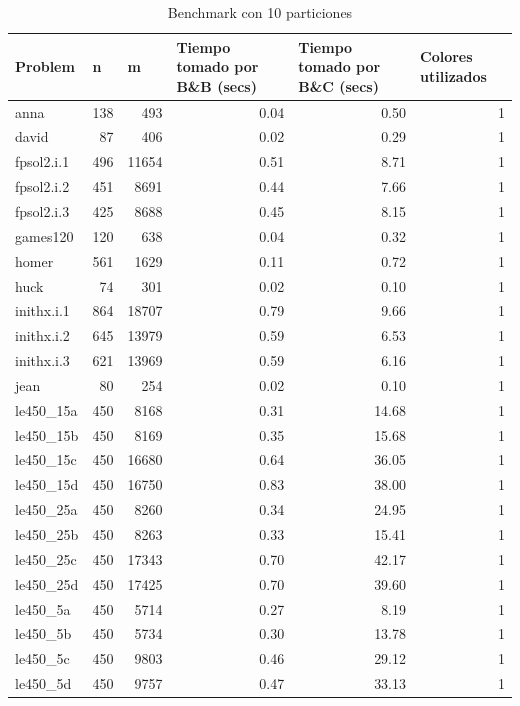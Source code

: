 \begin{table}[H]
\centering
\caption{Benchmark con 10 particiones}
\begin{tabular}{|l|r|r|r|r|r|}
\hline
Problem & \multicolumn{1}{l|}{n} & \multicolumn{1}{l|}{m} & \multicolumn{1}{l|}{Tiempo tomado por B\&B (secs)} & \multicolumn{1}{l|}{Tiempo tomado por B\&C (secs)} & \multicolumn{1}{l|}{Colores utilizados} \\ \hline
anna & 138 & 493 & 0.04 & 0.50 & 1 \\ \hline
david & 87 & 406 & 0.02 & 0.29 & 1 \\ \hline
fpsol2.i.1 & 496 & 11654 & 0.51 & 8.71 & 1 \\ \hline
fpsol2.i.2 & 451 & 8691 & 0.44 & 7.66 & 1 \\ \hline
fpsol2.i.3 & 425 & 8688 & 0.45 & 8.15 & 1 \\ \hline
games120 & 120 & 638 & 0.04 & 0.32 & 1 \\ \hline
homer & 561 & 1629 & 0.11 & 0.72 & 1 \\ \hline
huck & 74 & 301 & 0.02 & 0.10 & 1 \\ \hline
inithx.i.1 & 864 & 18707 & 0.79 & 9.66 & 1 \\ \hline
inithx.i.2 & 645 & 13979 & 0.59 & 6.53 & 1 \\ \hline
inithx.i.3 & 621 & 13969 & 0.59 & 6.16 & 1 \\ \hline
jean & 80 & 254 & 0.02 & 0.10 & 1 \\ \hline
le450\_15a & 450 & 8168 & 0.31 & 14.68 & 1 \\ \hline
le450\_15b & 450 & 8169 & 0.35 & 15.68 & 1 \\ \hline
le450\_15c & 450 & 16680 & 0.64 & 36.05 & 1 \\ \hline
le450\_15d & 450 & 16750 & 0.83 & 38.00 & 1 \\ \hline
le450\_25a & 450 & 8260 & 0.34 & 24.95 & 1 \\ \hline
le450\_25b & 450 & 8263 & 0.33 & 15.41 & 1 \\ \hline
le450\_25c & 450 & 17343 & 0.70 & 42.17 & 1 \\ \hline
le450\_25d & 450 & 17425 & 0.70 & 39.60 & 1 \\ \hline
le450\_5a & 450 & 5714 & 0.27 & 8.19 & 1 \\ \hline
le450\_5b & 450 & 5734 & 0.30 & 13.78 & 1 \\ \hline
le450\_5c & 450 & 9803 & 0.46 & 29.12 & 1 \\ \hline
le450\_5d & 450 & 9757 & 0.47 & 33.13 & 1 \\ \hline

\end{tabular}
\end{table}
